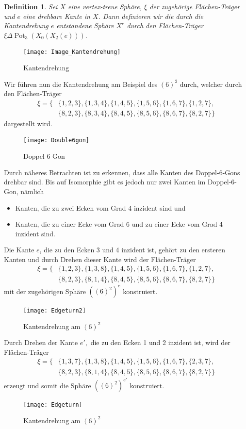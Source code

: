 \documentclass[12pt,titlepage,twoside,cleardoublepage]{article}
\theoremstyle{nummermitklammern}
\newtheorem{definition}[temp]{Definition}
\newtheorem{definition}[zahl]{Definition}
\numberwithin{equation}{section}
\DeclareMathOperator{\Pot}{Pot}
\begin{document}
\begin{definition}
Sei $X$ eine vertex-treue Sphäre, $\xi$ der zugehörige Flächen-Träger und $e$ eine drehbare Kante in $X$. Dann definieren wir die durch die Kantendrehung $e$ entstandene Sphäre $X^e$ durch den Flächen-Träger $\xi \Delta \Pot_3(X_0(X_2(e))).$
\end{definition}
\begin{figure}[H]
\begin{center}
\texttt{[image: Image\_Kantendrehung]}
\end{center}
\caption{Kantendrehung}
\end{figure}
 Wir führen nun die Kantendrehung am Beispiel des $(6)^2$  durch, welcher durch den Flächen-Träger
\begin{align*}
\xi=\{&\{1,2,3\},\{1,3,4\},\{1,4,5\},\{1,5,6\},\{1,6,7\},\{1,2,7\},\\ 
&\{8,2,3\},\{8,3,4\},\{8,4,5\},\{8,5,6\},\{8,6,7\},\{8,2,7\}\}
\end{align*}
dargestellt wird. 
\begin{figure}[H]
\begin{center}
\texttt{[image: Double6gon]}
\end{center}
\caption{Doppel-6-Gon}
\end{figure}
Durch näheres Betrachten ist zu erkennen, dass alle Kanten des Doppel-6-Gons drehbar sind. Bis auf Isomorphie gibt es jedoch nur zwei Kanten im Doppel-6-Gon, nämlich 
\begin{itemize}
\item Kanten, die zu zwei Ecken vom Grad 4 inzident sind und
\item Kanten, die zu einer Ecke vom Grad 6 und zu einer Ecke vom Grad 4 inzident sind.
\end{itemize} 
Die Kante $e$, die zu den Ecken 3 und 4 inzident ist, gehört zu den ersteren Kanten und durch Drehen dieser Kante wird der Flächen-Träger 
\begin{align*}
\xi=\{&\{1,2,3\},\{1,3,8\},\{1,4,5\},\{1,5,6\},\{1,6,7\},\{1,2,7\},\\ 
&\{8,2,3\},\{8,1,4\},\{8,4,5\},\{8,5,6\},\{8,6,7\},\{8,2,7\}\}
\end{align*}
mit der zugehörigen Sphäre ${((6)^2)}^e$ konstruiert.
\begin{figure}[H]
\begin{center}
\texttt{[image: Edgeturn2]}
\end{center}
\caption{Kantendrehung am $(6)^2$ }
\end{figure}
 Durch Drehen der Kante $e',$ die zu den Ecken 1 und 2 inzident ist, wird der Flächen-Träger 
\begin{align*}
\xi=\{&\{1,3,7\},\{1,3,8\},\{1,4,5\},\{1,5,6\},\{1,6,7\},\{2,3,7\},\\ 
&\{8,2,3\},\{8,1,4\},\{8,4,5\},\{8,5,6\},\{8,6,7\},\{8,2,7\}\}
\end{align*}
erzeugt und somit die Sphäre ${((6)^2)}^{e'}$ konstruiert.
\begin{figure}[H]
\begin{center}
\texttt{[image: Edgeturn]}
\end{center}
\caption{Kantendrehung am $(6)^2$ }
\end{figure}
\end{document}
